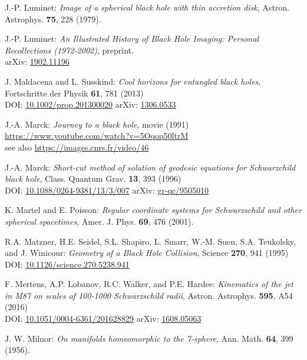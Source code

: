 \begin{thebibliography}{123}
J.-P. Luminet: {\em Image of a spherical black hole with thin accretion disk},
Astron. Astrophys. {\bf 75}, 228 (1979).

J.-P. Luminet:
{\em An Illustrated History of Black Hole Imaging: Personal Recollections (1972-2002)}, preprint.\\
arXiv: \href{https://arxiv.org/abs/1902.11196}{1902.11196}

J. Maldacena and L. Susskind:
{\em Cool horizons for entangled black holes},
Fortschritte der Physik {\bf 61}, 781 (2013)\\
DOI: \href{https://doi.org/10.1002/prop.201300020}{10.1002/prop.201300020}\hfill
arXiv: \href{https://arxiv.org/abs/1306.0533}{1306.0533}

J.-A. Marck:
{\em Journey to a black hole}, movie (1991)\\
\url{https://www.youtube.com/watch?v=5Oqop50ltrM}\\
see also \url{https://images.cnrs.fr/video/46}

J.-A. Marck:
{\em Short-cut method of solution of geodesic equations for Schwarzchild black hole},
Class. Quantum Grav. {\bf 13}, 393 (1996)\\
DOI: \href{https://doi.org/10.1088/0264-9381/13/3/007}{10.1088/0264-9381/13/3/007}\hfill
arXiv: \href{https://arxiv.org/abs/gr-qc/9505010}{gr-qc/9505010}

K. Martel and E. Poisson:
\emph{Regular coordinate systems for Schwarzschild and other spherical spacetimes},
Amer. J. Phys. {\bf 69}, 476 (2001).

R.A. Matzner, H.E. Seidel, S.L. Shapiro, L. Smarr, W.-M. Suen, S.A. Teukolsky, and
J. Winicour: {\em Geometry of a Black Hole Collision},
Science {\bf 270}, 941 (1995)\\
DOI: \href{https://doi.org/10.1126/science.270.5238.941}{10.1126/science.270.5238.941}

F. Mertens, A.P. Lobanov, R.C. Walker, and P.E. Hardee:
{\em Kinematics of the jet in M87 on scales of 100-1000 Schwarzschild radii},
Astron. Astrophys. {\bf 595}, A54 (2016)\\
DOI: \href{https://doi.org/10.1051/0004-6361/201628829}{10.1051/0004-6361/201628829}\hfill
arXiv: \href{https://arxiv.org/abs/1608.05063}{1608.05063}

J. W. Milnor: {\em On manifolds homeomorphic to the 7-sphere},
Ann. Math. {\bf 64}, 399 (1956).


\end{thebibliography}
